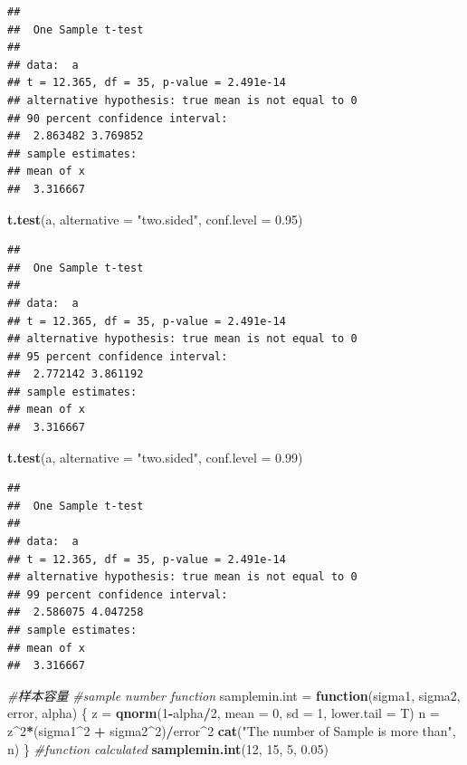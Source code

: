 \documentclass[]{ctexbook}
\newenvironment{Shaded}{\begin{snugshade}}{\end{snugshade}}
\newcommand{\CommentTok}[1]{\textcolor[rgb]{0.56,0.35,0.01}{\textit{#1}}}
\newcommand{\ControlFlowTok}[1]{\textcolor[rgb]{0.13,0.29,0.53}{\textbf{#1}}}
\newcommand{\DataTypeTok}[1]{\textcolor[rgb]{0.13,0.29,0.53}{#1}}
\newcommand{\DecValTok}[1]{\textcolor[rgb]{0.00,0.00,0.81}{#1}}
\newcommand{\FloatTok}[1]{\textcolor[rgb]{0.00,0.00,0.81}{#1}}
\newcommand{\KeywordTok}[1]{\textcolor[rgb]{0.13,0.29,0.53}{\textbf{#1}}}
\newcommand{\NormalTok}[1]{#1}
\newcommand{\OperatorTok}[1]{\textcolor[rgb]{0.81,0.36,0.00}{\textbf{#1}}}
\newcommand{\StringTok}[1]{\textcolor[rgb]{0.31,0.60,0.02}{#1}}
\begin{document}
\begin{verbatim}
## 
##  One Sample t-test
## 
## data:  a
## t = 12.365, df = 35, p-value = 2.491e-14
## alternative hypothesis: true mean is not equal to 0
## 90 percent confidence interval:
##  2.863482 3.769852
## sample estimates:
## mean of x 
##  3.316667
\end{verbatim}

\begin{Shaded}
\begin{Highlighting}[]
\KeywordTok{t.test}\NormalTok{(a, }\DataTypeTok{alternative =} \StringTok{"two.sided"}\NormalTok{, }\DataTypeTok{conf.level =} \FloatTok{0.95}\NormalTok{)}
\end{Highlighting}
\end{Shaded}

\begin{verbatim}
## 
##  One Sample t-test
## 
## data:  a
## t = 12.365, df = 35, p-value = 2.491e-14
## alternative hypothesis: true mean is not equal to 0
## 95 percent confidence interval:
##  2.772142 3.861192
## sample estimates:
## mean of x 
##  3.316667
\end{verbatim}

\begin{Shaded}
\begin{Highlighting}[]
\KeywordTok{t.test}\NormalTok{(a, }\DataTypeTok{alternative =} \StringTok{"two.sided"}\NormalTok{, }\DataTypeTok{conf.level =} \FloatTok{0.99}\NormalTok{)}
\end{Highlighting}
\end{Shaded}

\begin{verbatim}
## 
##  One Sample t-test
## 
## data:  a
## t = 12.365, df = 35, p-value = 2.491e-14
## alternative hypothesis: true mean is not equal to 0
## 99 percent confidence interval:
##  2.586075 4.047258
## sample estimates:
## mean of x 
##  3.316667
\end{verbatim}

\begin{Shaded}
\begin{Highlighting}[]
\CommentTok{#样本容量}
\CommentTok{#sample number function}
\NormalTok{samplemin.int =}\StringTok{ }\ControlFlowTok{function}\NormalTok{(sigma1, sigma2, error, alpha) \{}
\NormalTok{  z =}\StringTok{ }\KeywordTok{qnorm}\NormalTok{(}\DecValTok{1}\OperatorTok{-}\NormalTok{alpha}\OperatorTok{/}\DecValTok{2}\NormalTok{, }\DataTypeTok{mean =} \DecValTok{0}\NormalTok{, }\DataTypeTok{sd =} \DecValTok{1}\NormalTok{, }\DataTypeTok{lower.tail =}\NormalTok{ T)}
\NormalTok{  n =}\StringTok{ }\NormalTok{z}\OperatorTok{^}\DecValTok{2}\OperatorTok{*}\NormalTok{(sigma1}\OperatorTok{^}\DecValTok{2} \OperatorTok{+}\StringTok{ }\NormalTok{sigma2}\OperatorTok{^}\DecValTok{2}\NormalTok{)}\OperatorTok{/}\NormalTok{error}\OperatorTok{^}\DecValTok{2}
  \KeywordTok{cat}\NormalTok{(}\StringTok{"The number of Sample is more than"}\NormalTok{, n)}
\NormalTok{\}}
\CommentTok{#function calculated}
\KeywordTok{samplemin.int}\NormalTok{(}\DecValTok{12}\NormalTok{, }\DecValTok{15}\NormalTok{, }\DecValTok{5}\NormalTok{, }\FloatTok{0.05}\NormalTok{)}
\end{Highlighting}
\end{Shaded}
\end{document}
